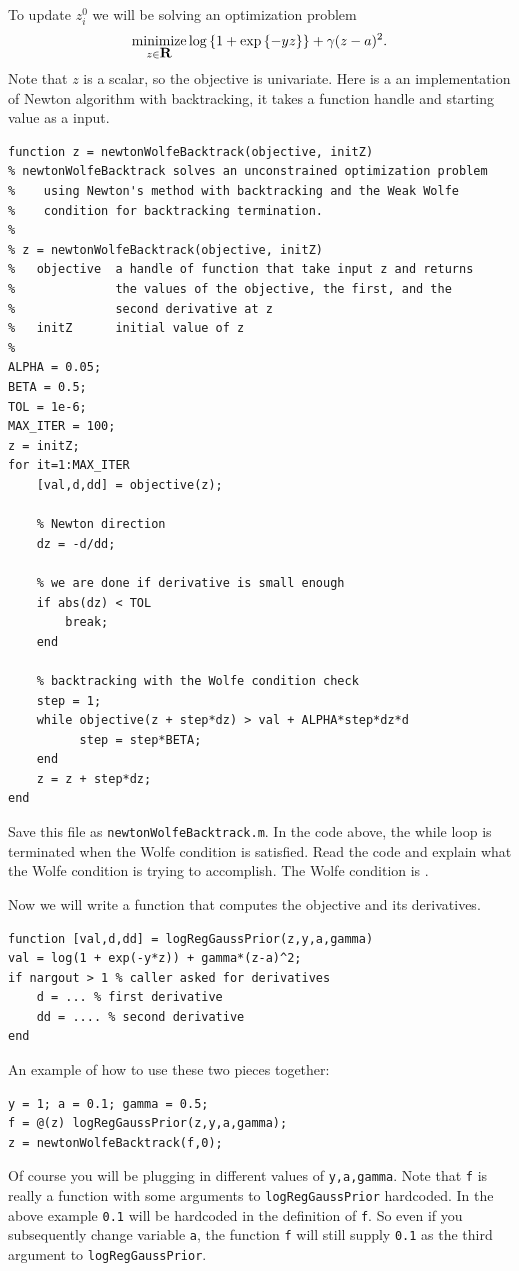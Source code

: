 \documentclass{article}
\begin{document}
{\newproblem{1pt}
To update $z^0_i$ we will be solving an optimization problem
\[
\mathop{\textrm{minimize}}_{z \in {\mbox{\bf R}}} \mathop{\rm log}\left\{1 + \mathop{\rm exp}\left\{-yz\right\}\right\} + \gamma(z - a)^2.
\]
Note that $z$ is a scalar, so the objective is univariate.
Here is a an implementation of Newton algorithm with backtracking, it takes a function handle and starting value as a input.


\begin{verbatim}
function z = newtonWolfeBacktrack(objective, initZ)
% newtonWolfeBacktrack solves an unconstrained optimization problem
%    using Newton's method with backtracking and the Weak Wolfe
%    condition for backtracking termination.
%
% z = newtonWolfeBacktrack(objective, initZ)
%   objective  a handle of function that take input z and returns
%              the values of the objective, the first, and the
%              second derivative at z
%   initZ      initial value of z
%
ALPHA = 0.05;
BETA = 0.5;
TOL = 1e-6;
MAX_ITER = 100;
z = initZ;
for it=1:MAX_ITER
    [val,d,dd] = objective(z);

    % Newton direction
    dz = -d/dd;

    % we are done if derivative is small enough
    if abs(dz) < TOL
        break;
    end

    % backtracking with the Wolfe condition check
    step = 1;
    while objective(z + step*dz) > val + ALPHA*step*dz*d
          step = step*BETA;
    end
    z = z + step*dz;
end
\end{verbatim}
Save this file as \texttt{newtonWolfeBacktrack.m}. In the code above, the while loop is terminated when the Wolfe condition is satisfied. Read the code and explain what the Wolfe condition is trying to accomplish. The Wolfe condition is \answer.

Now we will write a function that computes the objective and its derivatives.
\begin{verbatim}
function [val,d,dd] = logRegGaussPrior(z,y,a,gamma)
val = log(1 + exp(-y*z)) + gamma*(z-a)^2;
if nargout > 1 % caller asked for derivatives
    d = ... % first derivative
    dd = .... % second derivative
end
\end{verbatim}

An example of how to use these two pieces together:
\begin{verbatim}
y = 1; a = 0.1; gamma = 0.5;
f = @(z) logRegGaussPrior(z,y,a,gamma);
z = newtonWolfeBacktrack(f,0);
\end{verbatim}
Of course you will be plugging in different values of \texttt{y,a,gamma}. Note that \texttt{f} is really a function with some arguments to \texttt{logRegGaussPrior} hardcoded. In the above example \texttt{0.1} will be hardcoded in the definition of \texttt{f}.  So even if you subsequently change variable \texttt{a}, the function \texttt{f} will still supply \texttt{0.1} as the third argument to \texttt{logRegGaussPrior}.

}
\end{document}
